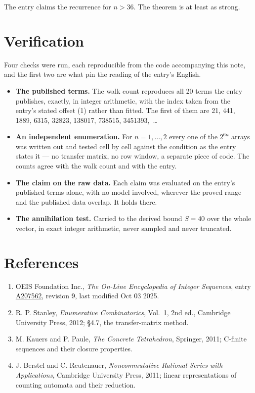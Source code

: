 \documentclass[11pt]{article}
\theoremstyle{definition}
\begin{document}
The entry claims the recurrence for $n > 36$. The theorem is at least as strong.

\section{Verification}

Four checks were run, each reproducible from the code accompanying this note, and the first two are what pin the reading of the entry's English.

\begin{itemize}

\item {\bfseries The published terms.} The walk count reproduces all 20 terms the entry publishes, exactly, in integer arithmetic, with the index taken from the entry's stated offset (1) rather than fitted. The first of them are 21, 441, 1889, 6315, 32823, 138017, 738515, 3451393,~\dots

\item {\bfseries An independent enumeration.} For $n = 1,\dots,2$ every one of the $2^{6n}$ arrays was written out and tested cell by cell against the condition as the entry states it --- no transfer matrix, no row window, a separate piece of code. The counts agree with the walk count and with the entry.

\item {\bfseries The claim on the raw data.} Each claim was evaluated on the entry's published terms alone, with no model involved, wherever the proved range and the published data overlap. It holds there.

\item {\bfseries The annihilation test.} Carried to the derived bound $S = 40$ over the whole vector, in exact integer arithmetic, never sampled and never truncated.

\end{itemize}

\section{References}

\begin{enumerate}

\item OEIS Foundation Inc., \emph{The On-Line Encyclopedia of Integer Sequences}, entry \href{https://oeis.org/A207562}{A207562}, revision 9, last modified Oct 03 2025.

\item R. P. Stanley, \emph{Enumerative Combinatorics}, Vol.~1, 2nd ed., Cambridge University Press, 2012; \S4.7, the transfer-matrix method.

\item M. Kauers and P. Paule, \emph{The Concrete Tetrahedron}, Springer, 2011; C-finite sequences and their closure properties.

\item J. Berstel and C. Reutenauer, \emph{Noncommutative Rational Series with Applications}, Cambridge University Press, 2011; linear representations of counting automata and their reduction.

\end{enumerate}
\end{document}
